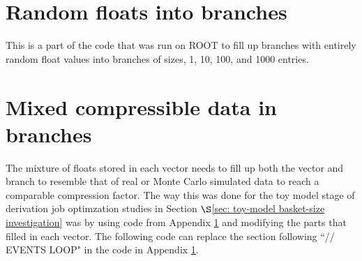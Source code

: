 \section{Random floats into branches}
\label{appendix:toy_model_no_mix_code}

This is a part of the code that was run on ROOT to fill up branches with entirely random float values into branches of sizes, 1, 10, 100, and 1000 entries.


\section{Mixed compressible data in branches}
\label{appendix:toy_model_WITH_mix_code}
The mixture of floats stored in each vector needs to fill up both the vector and branch to resemble that of real or Monte Carlo simulated data to reach a comparable compression factor.
The way this was done for the toy model stage of derivation job optimzation studies in Section $\S$\ref{sec: toy-model basket-size investigation} was by using code from Appendix \ref{appendix:toy_model_no_mix_code} and modifying the parts that filled in each vector.
The following code can replace the section following ``// EVENTS LOOP" in the code in Appendix \ref{appendix:toy_model_no_mix_code}. 

 